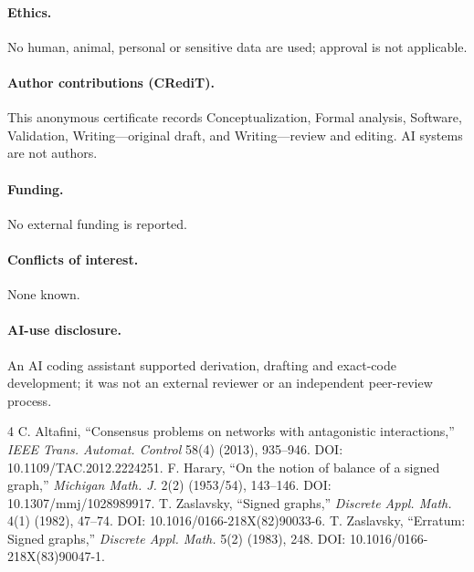 \documentclass[9pt]{extarticle}
\begin{document}
\paragraph{Ethics.} No human, animal, personal or sensitive data are used;
approval is not applicable.
\paragraph{Author contributions (CRediT).} This anonymous certificate records
Conceptualization, Formal analysis, Software, Validation, Writing---original
draft, and Writing---review and editing.  AI systems are not authors.
\paragraph{Funding.} No external funding is reported.
\paragraph{Conflicts of interest.} None known.
\paragraph{AI-use disclosure.} An AI coding assistant supported derivation,
drafting and exact-code development; it was not an external reviewer or an
independent peer-review process.

\begin{thebibliography}{4}
 C. Altafini, ``Consensus problems on networks with
antagonistic interactions,'' \emph{IEEE Trans. Automat. Control} 58(4) (2013),
935--946.
DOI: 10.1109/TAC.2012.2224251.
 F. Harary, ``On the notion of balance of a signed graph,''
\emph{Michigan Math. J.} 2(2) (1953/54), 143--146.
DOI: 10.1307/mmj/1028989917.
 T. Zaslavsky, ``Signed graphs,''
\emph{Discrete Appl. Math.} 4(1) (1982), 47--74.
DOI: 10.1016/0166-218X(82)90033-6.
 T. Zaslavsky, ``Erratum: Signed graphs,''
\emph{Discrete Appl. Math.} 5(2) (1983), 248.
DOI: 10.1016/0166-218X(83)90047-1.
\end{thebibliography}
\end{document}
